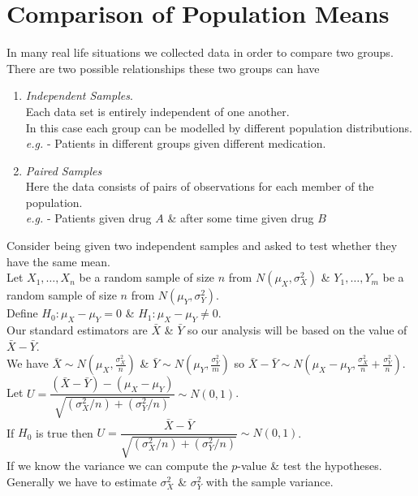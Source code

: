 \documentclass[11pt,a4paper]{article}
\begin{document}
\section{Comparison of Population Means}

In many real life situations we collected data in order to compare two groups.\\
There are two possible relationships these two groups can have
\begin{enumerate}[label=\roman*)]
	\item \textit{Independent Samples}.\\
	Each data set is entirely independent of one another.\\
	In this case each group can be modelled by different population distributions.\\
	\textit{e.g.} - Patients in different groups given different medication.
	\item \textit{Paired Samples}\\
	Here the data consists of pairs of observations for each member of the population.\\
	\textit{e.g.} - Patients given drug $A$ \& after some time given drug $B$
\end{enumerate}

Consider being given two independent samples and asked to test whether they have the same mean.\\
Let $X_1,\dots,X_n$ be a random sample of size $n$ from $N(\mu_X,\sigma^2_X)$ \& $Y_1,\dots,Y_m$ be a random sample of size $n$ from $N(\mu_Y,\sigma^2_Y)$.\\
Define $H_0: \mu_X-\mu_Y=0$ \& $H_1:\mu_X-\mu_Y\neq0$.\\
Our standard estimators are $\bar{X}$ \& $\bar{Y}$ so our analysis will be based on the value of $\bar{X}-\bar{Y}$.\\
We have $\bar{X}\sim N\left(\mu_X,\frac{\sigma_X^2}{n}\right)$ \& $\bar{Y}\sim N\left(\mu_Y,\frac{\sigma_Y^2}{m}\right)$ so $\bar{X}-\bar{Y}\sim N\left(\mu_X-\mu_Y,\frac{\sigma_X^2}{n}+\frac{\sigma_Y^2}{n}\right)$.\\
Let $U=\dfrac{(\bar{X}-\bar{Y})-(\mu_X-\mu_Y)}{\sqrt{(\sigma_X^2/n)+(\sigma_Y^2/n)}}\sim N(0,1)$.\\
If $H_0$ is true then $U=\dfrac{\bar{X}-\bar{Y}}{\sqrt{(\sigma_X^2/n)+(\sigma_Y^2/n)}}\sim N(0,1)$.\\
If we know the variance we can compute the $p$-value \& test the hypotheses.\\
\nb Generally we have to estimate $\sigma_X^2$ \& $\sigma_Y^2$ with the sample variance.\\
\end{document}
